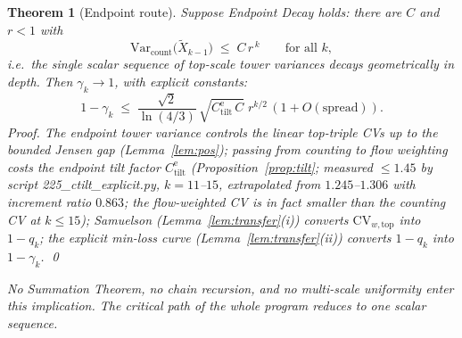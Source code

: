 \documentclass[11pt]{article}
\newtheorem{theorem}{Theorem}[section]
\theoremstyle{definition}
\newcommand{\Var}{\mathrm{Var}}
\begin{document}
\begin{theorem}[Endpoint route]\label{thm:endpoint}
Suppose \emph{Endpoint Decay} holds: there are $C$ and $r < 1$ with
\[
\Var_{\mathrm{count}}\big(\tilde X_{k-1}\big) \;\le\; C\,r^{\,k}
\qquad\text{for all } k,
\]
i.e.\ the \emph{single scalar sequence} of top-scale tower variances
decays geometrically in depth. Then $\gamma_k \to 1$, with explicit
constants:
\[
1 - \gamma_k \;\le\; \frac{\sqrt2}{\ln(4/3)}\,
\sqrt{C^{\mathrm{e}}_{\mathrm{tilt}}\, C}\;r^{k/2}\,(1 + O(\text{spread})).
\]
\emph{Proof.} The endpoint tower variance controls the linear top-triple
CVs up to the bounded Jensen gap (Lemma~\ref{lem:pos}); passing from
counting to flow weighting costs the endpoint tilt factor
$C^{\mathrm{e}}_{\mathrm{tilt}}$ (Proposition~\ref{prop:tilt}; measured
$\le 1.45$ by script 225\_ctilt\_explicit.py, $k=11$--$15$, extrapolated
from $1.245$--$1.306$ with increment ratio $0.863$; the flow-weighted CV
is in fact \emph{smaller} than the counting CV at $k \le 15$); Samuelson (Lemma~\ref{lem:transfer}(i))
converts $\mathrm{CV}_{w,\mathrm{top}}$ into $1 - q_k$; the explicit
min-loss curve (Lemma~\ref{lem:transfer}(ii)) converts $1-q_k$ into
$1-\gamma_k$. \qed

\emph{No Summation Theorem, no chain recursion, and no multi-scale
uniformity enter this implication.} The critical path of the whole
program reduces to one scalar sequence.
\end{theorem}
\end{document}
